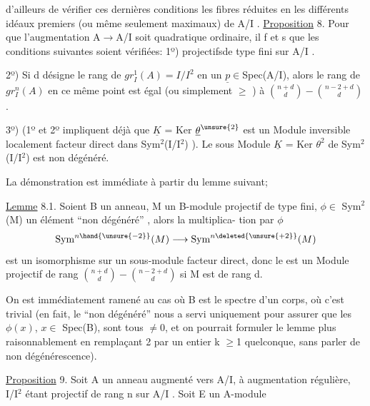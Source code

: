 d'ailleurs de vérifier ces dernières conditions  les fibres réduites
en les différents idéaux premiers (ou même seulement maximaux) de A/I .
\uline{Proposition} 8. Pour que l'augmentation A$\rightarrow$A/I soit  quadratique
ordinaire, il f et s que les conditions suivantes soient vérifiées:
1º)    projectifsde type fini sur A/I .

2º) Si d désigne le rang de $gr^{1}_{I}(A) = I/I^{2}$ en un $\underline{p} \in$Spec(A/I),
alors le rang de $gr^{n}_{I}(A)$ en ce même point est égal (ou simplement
$\geqslant$ ) à $\binom{n+d}{d} - \binom{n-2+d}{d}$ .

3º) (1º et 2º impliquent déjà que $\underline{K}$ = Ker $\underline{\theta}^{\unsure{2}}$ est un Module
inversible localement facteur direct dans  Sym$^{2}$(I/I$^{2}$) ). Le sous
Module $\underline{K}$ = Ker $\theta^{2}$ de Sym$^{2}$(I/I$^{2}$) est non dégénéré.

La démonstration est immédiate à partir du lemme suivant; 

 \uline{Lemme} 8.1. Soient B un anneau, M un B-module projectif de
type fini, $\phi \in$ Sym$^{2}$(M) un élément ``non dégénéré'' , alors la multiplica-%
tion par $\phi$
\[ \mathrm{Sym}^{n\hand{\unsure{-2}}}(M) \longrightarrow \mathrm{Sym}^{n\deleted{\unsure{+2}}}(M) \]
est un isomorphisme sur un sous-module facteur direct, donc le 
est un Module projectif de rang $\binom{n+d}{d} - \binom{n-2+d}{d}$ si M est de rang d.

On est immédiatement ramené au cas où B est le spectre d'un corps,
où c'est trivial (en fait, le ``non dégénéré'' nous a servi uniquement
\margin{||} pour assurer que les $\phi(x)$, $x \in$ Spec(B), sont tous $\neq 0$, et on pourrait
formuler le lemme plus raisonnablement en remplaçant 2 par un entier
k $\geqslant$1 quelconque, sans parler de non dégénérescence).

\uline{Proposition} 9. Soit A un anneau augmenté vers A/I, à augmentation
régulière, I/I$^{2}$ étant projectif de rang n sur A/I . Soit E un A-module

